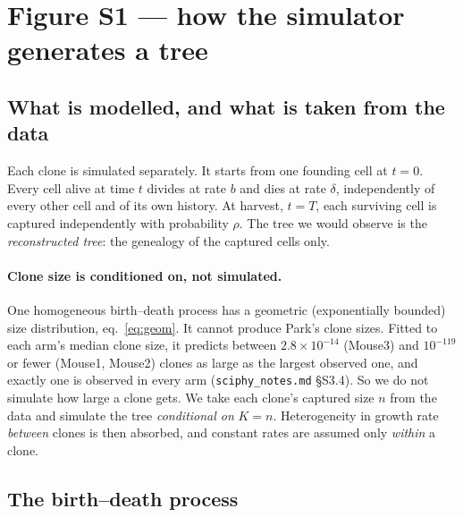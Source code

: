 \documentclass[11pt]{article}
\newcommand{\bdrate}{b}          %
\newcommand{\dthrate}{\delta}    %
\newcommand{\capt}{\rho}         %
\begin{document}
\section{Figure S1 --- how the simulator generates a tree}\label{sec:S1}

\subsection{What is modelled, and what is taken from the data}

Each clone is simulated separately. It starts from one founding cell at $t=0$. Every cell
alive at time $t$ divides at rate $\bdrate$ and dies at rate $\dthrate$, independently of every
other cell and of its own history. At harvest, $t=T$, each surviving cell is captured
independently with probability $\capt$. The tree we would observe is the \emph{reconstructed
tree}: the genealogy of the captured cells only.

\paragraph{Clone size is conditioned on, not simulated.} One homogeneous birth--death process
has a geometric (exponentially bounded) size distribution, eq.~\eqref{eq:geom}. It cannot produce
Park's clone sizes. Fitted to each arm's median clone size, it predicts between
$2.8\times10^{-14}$ (Mouse3) and $10^{-119}$ or fewer (Mouse1, Mouse2) clones as large as the
largest observed one, and exactly one is observed in every arm (\texttt{sciphy\_notes.md}
\S S3.4). So we do not simulate how large a clone gets. We take each clone's captured size $n$
from the data and simulate the tree \emph{conditional on} $K=n$. Heterogeneity in growth rate
\emph{between} clones is then absorbed, and constant rates are assumed only \emph{within} a clone.

\subsection{The birth--death process}
\end{document}
